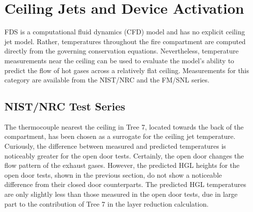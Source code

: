 


\chapter{Ceiling Jets and Device Activation}

FDS is a computational fluid dynamics (CFD) model and has no explicit ceiling jet model.
Rather, temperatures throughout the fire compartment are computed directly from the governing conservation equations.
Nevertheless, temperature measurements near the ceiling can be used to evaluate the model's ability to predict the flow of
hot gases across a relatively flat ceiling. Measurements for this category are available from the NIST/NRC and the FM/SNL series.

\section{NIST/NRC Test Series}

The thermocouple nearest the ceiling in Tree 7, located towards the back of the compartment,
has been chosen as a surrogate for the ceiling jet temperature.
Curiously, the difference between measured and predicted temperatures is noticeably greater for the open door tests.
Certainly, the open door changes the flow pattern of the exhaust gases.
However, the predicted HGL heights for the open door tests, shown in the previous section,
do not show a noticeable difference from their closed door counterparts.
The predicted HGL temperatures are only slightly less than those measured in the open door tests,
due in large part to the contribution of Tree 7 in the layer reduction calculation.

